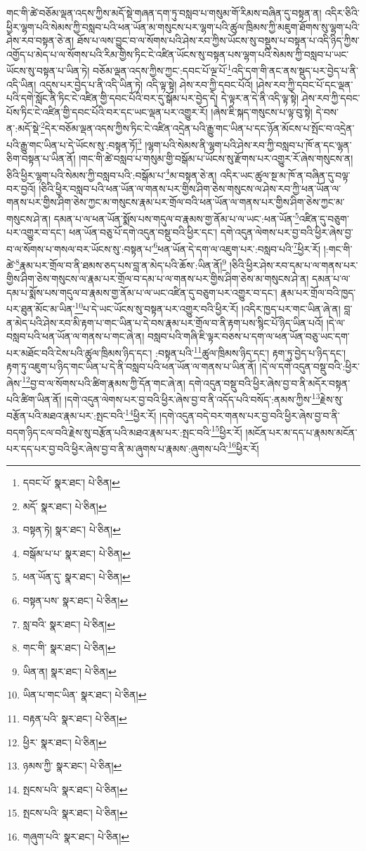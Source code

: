 གང་གི་ཚེ་བཅོམ་ལྡན་འདས་ཀྱིས་མདོ་སྡེ་གཞན་དག་ཏུ་བསླབ་པ་གསུམ་གོ་རིམས་བཞིན་དུ་བསྟན་ན། འདིར་ཅིའི་ཕྱིར་ལྷག་པའི་སེམས་ཀྱི་བསླབ་པའི་ཕན་ཡོན་མ་གསུངས་པར་ལྷག་པའི་ཚུལ་ཁྲིམས་ཀྱི་མཇུག་ཐོགས་སུ་ལྷག་པའི་ཤེས་རབ་བསྟན་ཅེ་ན། ཐོས་པ་ལས་བྱུང་བ་ལ་སོགས་པའི་ཤེས་རབ་ཀྱིས་ཡོངས་སུ་བསྡུས་པ་བསྟན་པ་འདི་ཉིད་ཀྱིས་འགྱོད་པ་མེད་པ་ལ་སོགས་པའི་རིམ་གྱིས་ཏིང་ངེ་འཛིན་ཡོངས་སུ་བསྟན་པས་ལྷག་པའི་སེམས་ཀྱི་བསླབ་པ་ཡང་ཡོངས་སུ་བསྟན་པ་ཡིན་ཏེ། བཅོམ་ལྡན་འདས་ཀྱིས་ཀྱང་:དབང་པོ་ལྔ་པོ་\footnote{དབང་པོ་  སྣར་ཐང་།  པེ་ཅིན། }འདི་དག་གི་ནང་ནས་སྡུད་པར་བྱེད་པ་ནི་འདི་ཡིན། འདུས་པར་བྱེད་པ་ནི་འདི་ཡིན་ཏེ། འདི་ལྟ་སྟེ། ཤེས་རབ་ཀྱི་དབང་པོའོ། །ཤེས་རབ་ཀྱི་དབང་པོ་དང་ལྡན་པའི་དགེ་སློང་ནི་ཏིང་ངེ་འཛིན་གྱི་དབང་པོའི་བར་དུ་སྒོམ་པར་བྱེད་དེ། དེ་ལྟར་ན་དེ་ནི་འདི་ལྟ་སྟེ། ཤེས་རབ་ཀྱི་དབང་པོས་ཏིང་ངེ་འཛིན་གྱི་དབང་པོའི་བར་དང་ཡང་ལྡན་པར་འགྱུར་རོ། །ཞེས་ཇི་སྐད་གསུངས་པ་ལྟ་བུ་སྟེ། དེ་བས་ན་:མདོ་སྡེ་\footnote{མདོ་  སྣར་ཐང་།  པེ་ཅིན། }དེར་བཅོམ་ལྡན་འདས་ཀྱིས་ཏིང་ངེ་འཛིན་འདྲེན་པའི་རྒྱུ་གང་ཡིན་པ་དང་ཉོན་མོངས་པ་སྤོང་བ་འདྲེན་པའི་རྒྱུ་གང་ཡིན་པ་དེ་ཡོངས་སུ་:བསྟན་ཏོ།\footnote{བསྟན་ཏེ།  སྣར་ཐང་།  པེ་ཅིན། } །ལྷག་པའི་སེམས་ནི་ལྷག་པའི་ཤེས་རབ་ཀྱི་བསླབ་པ་ཁོ་ན་དང་ལྷན་ཅིག་བསྟན་པ་ཡིན་ནོ། །གང་གི་ཚེ་བསླབ་པ་གསུམ་གྱི་བསྒོམ་པ་ཡོངས་སུ་རྫོགས་པར་འགྱུར་རོ་ཞེས་གསུངས་ན། ཅིའི་ཕྱིར་ལྷག་པའི་སེམས་ཀྱི་བསླབ་པའི་:བསྒོམ་པ་\footnote{བསྒོམ་པ་པ་  སྣར་ཐང་།  པེ་ཅིན། }མ་བསྟན་ཅེ་ན། འདིར་ཡང་ཚུལ་སྔ་མ་ཁོ་ན་བཞིན་དུ་བལྟ་བར་བྱའོ། །ཅིའི་ཕྱིར་བསླབ་པའི་ཕན་ཡོན་ལ་གནས་པར་གྱིས་ཤིག་ཅེས་གསུངས་ལ་ཤེས་རབ་ཀྱི་ཕན་ཡོན་ལ་གནས་པར་གྱིས་ཤིག་ཅེས་ཀྱང་མ་གསུངས་རྣམ་པར་གྲོལ་བའི་ཕན་ཡོན་ལ་གནས་པར་གྱིས་ཤིག་ཅེས་ཀྱང་མ་གསུངས་ཤེ་ན། དམན་པ་ལ་ཕན་ཡོན་སྨོས་པས་གདུལ་བ་རྣམས་གྱ་ནོམ་པ་ལ་ཡང་:ཕན་ཡོན་\footnote{ཕན་ཡོན་དུ་  སྣར་ཐང་།  པེ་ཅིན། }འཛིན་དུ་བཅུག་པར་འགྱུར་བ་དང་། ཕན་ཡོན་བཅུ་པོ་དགེ་འདུན་བསྡུ་བའི་ཕྱིར་དང་། དགེ་འདུན་ལེགས་པར་བྱ་བའི་ཕྱིར་ཞེས་བྱ་བ་ལ་སོགས་པ་གསལ་བར་ཡོངས་སུ་:བསྟན་པ་\footnote{བསྟན་པས་  སྣར་ཐང་།  པེ་ཅིན། }ཕན་ཡོན་དེ་དག་ལ་འཇུག་པར་:བསླབ་པའི་\footnote{སླ་བའི་  སྣར་ཐང་།  པེ་ཅིན། }ཕྱིར་རོ། །:གང་གི་ཚེ་\footnote{གང་གི་  སྣར་ཐང་།  པེ་ཅིན། }རྣམ་པར་གྲོལ་བ་ནི་ཐམས་ཅད་པས་བླ་ན་མེད་པའི་ཆོས་:ཡིན་ནོ།\footnote{ཡིན་ན།  སྣར་ཐང་།  པེ་ཅིན། } །ཅིའི་ཕྱིར་ཤེས་རབ་དམ་པ་ལ་གནས་པར་གྱིས་ཤིག་ཅེས་གསུངས་ལ་རྣམ་པར་གྲོལ་བ་དམ་པ་ལ་གནས་པར་གྱིས་ཤིག་ཅེས་མ་གསུངས་ཤེ་ན། དམན་པ་ལ་དམ་པ་སྨོས་པས་གདུལ་བ་རྣམས་གྱ་ནོམ་པ་ལ་ཡང་འཛིན་དུ་བཅུག་པར་འགྱུར་བ་དང་། རྣམ་པར་གྲོལ་བའི་ཁྱད་པར་ཐུན་མོང་མ་ཡིན་\footnote{ཡིན་པ་གང་ཡིན་  སྣར་ཐང་།  པེ་ཅིན། }པ་དེ་ཡང་ཡོངས་སུ་བསྟན་པར་འགྱུར་བའི་ཕྱིར་རོ། །འདིར་ཁྱད་པར་གང་ཡིན་ཞེ་ན། བླ་ན་མེད་པའི་ཤེས་རབ་མི་རྟག་པ་གང་ཡིན་པ་དེ་བས་རྣམ་པར་གྲོལ་བ་ནི་རྟག་པས་སྙིང་པོ་ཉིད་ཡིན་པའོ། །དེ་ལ་བསླབ་པའི་ཕན་ཡོན་ལ་གནས་པ་གང་ཞེ་ན། བསླབ་པའི་གཞི་ཇི་ལྟར་བཅས་པ་དག་ལ་ཕན་ཡོན་བཅུ་ཡང་དག་པར་མཐོང་བའི་ངེས་པའི་ཚུལ་ཁྲིམས་ཉིད་དང་། :བསྟན་པའི་\footnote{བརྟན་པའི་  སྣར་ཐང་།  པེ་ཅིན། }ཚུལ་ཁྲིམས་ཉིད་དང་། རྟག་ཏུ་བྱེད་པ་ཉིད་དང་། རྟག་ཏུ་འཇུག་པ་ཉིད་གང་ཡིན་པ་དེ་ནི་བསླབ་པའི་ཕན་ཡོན་ལ་གནས་པ་ཡིན་ནོ། །དེ་ལ་དགེ་འདུན་བསྡུ་བའི་:ཕྱིར་ཞེས་\footnote{ཕྱིར་  སྣར་ཐང་།  པེ་ཅིན། }བྱ་བ་ལ་སོགས་པའི་ཚིག་རྣམས་ཀྱི་དོན་གང་ཞེ་ན། དགེ་འདུན་བསྡུ་བའི་ཕྱིར་ཞེས་བྱ་བ་ནི་མདོར་བསྟན་པའི་ཚིག་ཡིན་ནོ། །དགེ་འདུན་ལེགས་པར་བྱ་བའི་ཕྱིར་ཞེས་བྱ་བ་ནི་འདོད་པའི་བསོད་:ནམས་ཀྱིས་\footnote{ཉམས་ཀྱི་  སྣར་ཐང་།  པེ་ཅིན། }རྗེས་སུ་བརྩོན་པའི་མཐའ་རྣམ་པར་:སྤང་བའི་\footnote{སྤངས་པའི་  སྣར་ཐང་།  པེ་ཅིན། }ཕྱིར་རོ། །དགེ་འདུན་བདེ་བར་གནས་པར་བྱ་བའི་ཕྱིར་ཞེས་བྱ་བ་ནི་བདག་ཉིད་ངལ་བའི་རྗེས་སུ་བརྩོན་པའི་མཐའ་རྣམ་པར་:སྤང་བའི་\footnote{སྤངས་པའི་  སྣར་ཐང་།  པེ་ཅིན། }ཕྱིར་རོ། །མངོན་པར་མ་དད་པ་རྣམས་མངོན་པར་དད་པར་བྱ་བའི་ཕྱིར་ཞེས་བྱ་བ་ནི་མ་ཞུགས་པ་རྣམས་:ཞུགས་པའི་\footnote{གཞུག་པའི་  སྣར་ཐང་།  པེ་ཅིན། }ཕྱིར་རོ། 